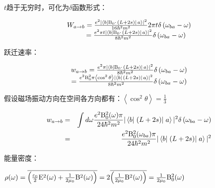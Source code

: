 $t$趋于无穷时，可化为$\delta$函数形式：

\begin{equation}\label{25-23}
\begin{array}{c}
W_{a \to b}  = \frac{{e^2 | \left\langle b \right|{\rm B}_0  \cdot
\left. {\left( {L + 2s} \right)} \right|\left. a \right\rangle |^2
}}{{16\hbar ^2 m^2 }}2\pi t\delta \left( {\omega _{ba}  - \omega }
\right) \\
\qquad = \frac{{e^2 \pi t | \left\langle b \right|{\rm B}_0  \cdot
\left. {\left( {L + 2s} \right)} \right|\left. a \right\rangle |^2
}}{{8\hbar ^2 m^2 }}\delta \left( {\omega _{ba}  - \omega } \right)\\
\end{array}
\end{equation}

跃迁速率：

\begin{equation}\label{25-24}
\begin{array}{c}
w_{a \to b}  = \frac{{e^2 \pi | \left\langle b \right|{\rm B}_0
\cdot \left. {\left( {L + 2s} \right)} \right|\left. a \right\rangle
|^2 }}{{8\hbar ^2 m^2 }}\delta \left( {\omega _{ba}  - \omega }
\right) \\
= \frac{{e^2 {\rm B}_0^2 \pi \left\langle {\cos ^2 \theta }
\right\rangle | \left\langle b \right|\left. {\left( {L + 2s}
\right)} \right|\left. a \right\rangle |^2 }}{{8\hbar ^2 m^2
}}\delta \left( {\omega _{ba}  - \omega } \right)
\end{array}
\end{equation}

假设磁场振动方向在空间各方向都有：$\left\langle {\cos ^2 \theta } \right\rangle  = \frac{1}{3}$

\begin{eqnarray*}
w_{a \to b} &  = & \int {d\omega \frac{{e^2 {\rm B}_0^2 (\omega )\pi
}}{{24\hbar ^2 m^2 }} | \left\langle b \right|\left. {\left( {L +
2s} \right)} \right|\left. a \right\rangle |^2 \delta \left( {\omega
_{ba}  - \omega } \right)}  \\
{} & = & \frac{{e^2 {\rm B}_0^2 (\omega _{ba}
)\pi }}{{24\hbar ^2 m^2 }} | \left\langle b \right|\left. {\left( {L
+ 2s} \right)} \right|\left. a \right\rangle |^2
\end{eqnarray*}

能量密度：

$\rho (\omega ) = \overline {\left( {{\textstyle{{\varepsilon _0 } \over 2}}{\rm E}^2 (\omega ) + {\textstyle{1 \over {2\mu _0 }}}{\rm B}^2 (\omega )} \right)}  = 2\overline {\left( {{\textstyle{1 \over {2\mu _0 }}}{\rm B}^2 (\omega )} \right)}  = {\textstyle{1 \over {2\mu _0 }}}{\rm B}_0^2 (\omega )$

